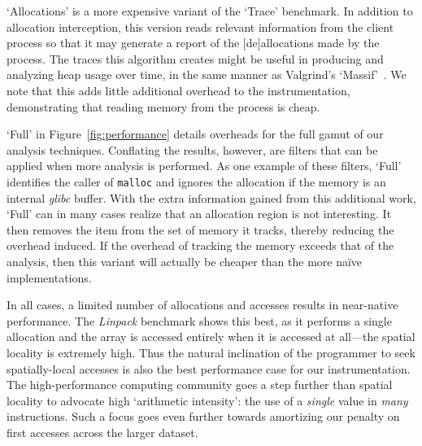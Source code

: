 `Allocations' is a more expensive variant of the `Trace' benchmark.
In addition to allocation interception, this version reads relevant
information from the client process so that it may generate a report
of the [de]allocations made by the process.  The traces this algorithm
creates might be useful in producing and analyzing heap usage over
time, in the same manner as Valgrind's
`Massif'~\cite{Nethercote:2006:Massif}.  We note that this adds little
additional overhead to the instrumentation, demonstrating that reading
memory from the process is cheap.


`Full' in
Figure~\ref{fig:performance} details overheads for the full gamut of
our analysis techniques.  Conflating the results, however, are filters
that can be applied when more analysis is performed.  As one example of
these
filters, `Full' identifies the caller of \texttt{malloc} and ignores
the allocation if the
memory is an internal \textit{glibc} buffer.  With the extra
information gained from this additional work, `Full' can in many
cases realize that an allocation region is not interesting.  It then
removes the item from the set of memory it tracks, thereby reducing the
overhead induced.  If the overhead of tracking the memory exceeds that
of the analysis, then this variant will actually be cheaper than the
more na\"ive implementations.


In all cases, a limited number of allocations and accesses results in
near-native performance.  The
\textit{Linpack} benchmark shows this best, as it performs a single
allocation and the array is accessed entirely when it is accessed
at all---the spatial locality is extremely high.  Thus the natural
inclination of the programmer to seek spatially-local accesses
is also the best performance case for our instrumentation.  The
high-performance computing community goes a step further than spatial
locality to advocate high
`arithmetic intensity': the use of a \emph{single} value in \emph{many}
instructions.  Such a focus goes even further towards amortizing our
penalty on first accesses across the larger dataset.

